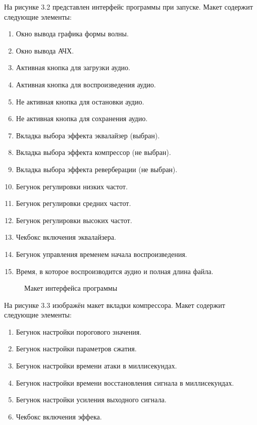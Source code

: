 На рисунке 3.2 представлен интерфейс программы при запуске. Макет содержит следующие элементы:
\begin{enumerate}
	\item Окно вывода графика формы волны.
	\item Окно вывода АЧХ.
	\item Активная кнопка для загрузки аудио.
	\item Активная кнопка для воспроизведения аудио.
	\item Не активная кнопка для остановки аудио.
	\item Не активная кнопка для сохранения аудио.
	\item Вкладка выбора эффекта эквалайзер (выбран).
	\item Вкладка выбора эффекта компрессор (не выбран).
	\item Вкладка выбора эффекта реверберации (не выбран).
	\item Бегунок регулировки низких частот.
	\item Бегунок регулировки средних частот.
	\item Бегунок регулировки высоких частот.
	\item Чекбокс включения эквалайзера.
	\item Бегунок управления временем начала воспроизведения.
	\item Время, в которое воспроизводится аудио и полная длина файла.
\end{enumerate}

\begin{figure}[ht]
	\center{\texttt{[image: 1]}}
	\caption{Макет интерфейса программы}
	\label{1:image}
\end{figure}
\clearpage

На рисунке 3.3 изображён макет вкладки компрессора. Макет содержит следующие элементы:
\begin{enumerate}
	\item Бегунок настройки порогового значения.
	\item Бегунок настройки параметров сжатия.
	\item Бегунок настройки времени атаки в миллисекундах.
	\item Бегунок настройки времени восстановления сигнала в миллисекундах.
	\item Бегунок настройки усиления выходного сигнала.
	\item Чекбокс включения эффека.
\end{enumerate}

